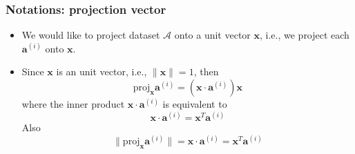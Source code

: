 \documentclass[serif]{beamer}
\begin{document}
\begin{frame}
    \frametitle{Notations: projection vector}
    \begin{itemize}
        \item We would like to project dataset $\mathcal{A}$ onto a unit vector $\mathbf{x}$, i.e., we project each $\mathbf{a}^{(i)}$ onto $\mathbf{x}$.
        \begin{center}
        \end{center}
        \item Since $\mathbf{x}$ is an unit vector, i.e., $\|\mathbf{x}\|=1$, then
        $$
        \mathrm{proj}_{\mathbf{x}}\mathbf{a}^{(i)} = (\mathbf{x}\cdot\mathbf{a}^{(i)})\mathbf{x}
        $$
        where the inner product $\mathbf{x}\cdot\mathbf{a}^{(i)}$ is equivalent to
        $$
        \mathbf{x}\cdot\mathbf{a}^{(i)} = \mathbf{x}^T\mathbf{a}^{(i)}
        $$
        Also
        $$
        \|\mathrm{proj}_{\mathbf{x}}\mathbf{a}^{(i)}\| = \mathbf{x}\cdot\mathbf{a}^{(i)} = \mathbf{x}^T\mathbf{a}^{(i)}
        $$
    \end{itemize}
\end{frame}
\end{document}
